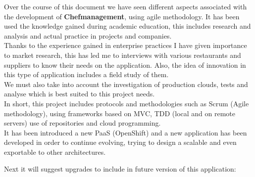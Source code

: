 

Over the course of this document we have seen different aspects associated with the development of \textbf{Chefmanagement}, using agile methodology. It has been used the knowledge gained during academic education, this includes research and analysis and actual practice in projects and companies. \\

Thanks to the experience gained in enterprise practices I have given importance to market research, this has led me to interviews with various restaurants and suppliers to know their needs on the application. Also, the idea of innovation in this type of application includes a field study of them. \\

We must also take into account the investigation of production clouds, tests and analyse which is best suited to this project needs. \\

In short, this project includes protocols and methodologies such as Scrum (Agile methodology), using frameworks based on MVC, TDD (local and on remote servers) use of repositories and cloud programming. \\

It has been introduced a new PaaS (OpenShift) and a new application has been developed in order to continue evolving, trying to design a scalable and even exportable to other architectures.

\newpage

Next it will suggest upgrades to include in future version of this application:

